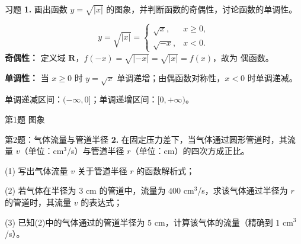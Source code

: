 \documentclass[10pt,aspectratio=169,serif,fleqn]{beamer}
\begin{document}
\begin{frame}[t]{习题 \textbf{1.} 画出函数 $y=\sqrt{|x|}$ 的图象，并判断函数的奇偶性，讨论函数的单调性。}


\begin{tcolorbox}[colback=orange!10,colframe=orange,title=\textbf{解}]
	\[
	y=\sqrt{|x|}=\begin{cases}\sqrt{x}, & x\ge 0,\\ \sqrt{-x}, & x<0.\end{cases}
	\]
	\textbf{奇偶性：} 定义域 $\mathbf{R}$，$f(-x)=\sqrt{|-x|}=\sqrt{|x|}=f(x)$，故为 \alert{偶函数}。
	
	\vspace{0.5em}
	\textbf{单调性：} 当 $x\ge0$ 时 $y=\sqrt{x}$ 单调递增；由偶函数对称性，$x<0$ 时单调递减。
	
	\vspace{0.3em}
	单调递减区间：$(-\infty,0]$；单调递增区间：$[0,+\infty)$。
\end{tcolorbox}
\end{frame}



\begin{frame}[t]{第1题 图象}
\begin{center}
\end{center}
\end{frame}

\begin{frame}[t]{第2题：气体流量与管道半径}
\textbf{2.} 在固定压力差下，当气体通过圆形管道时，其流量 $v$（单位：cm$^3$/s）与管道半径 $r$（单位：cm）的四次方成正比。

(1) 写出气体流量 $v$ 关于管道半径 $r$ 的函数解析式；

(2) 若气体在半径为 $3$ cm 的管道中，流量为 $400$ cm$^3$/s，求该气体通过半径为 $r$ 的管道时，其流量 $v$ 的表达式；

(3) 已知(2)中的气体通过的管道半径为 $5$ cm，计算该气体的流量（精确到 $1$ cm$^3$/s）。
\end{frame}
\end{document}
